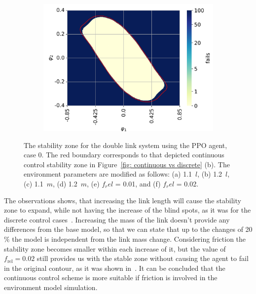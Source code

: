 \begin{figure}[h!]
\begin{subfigure}[t]{0.32\textwidth}
         \includegraphics[width=\textwidth]{Figures/DP_friction_0.02.png}
         \label{fig: DP friction 0.02}
         \caption{}
     \end{subfigure}

     \caption{The stability zone for the double link system using the PPO agent, case 0. The red boundary corresponds to that depicted continuous control stability zone in Figure~\ref{fig: continuous vs discrete} (b). The environment parameters are modified as follows: (a) 1.1~$l$, (b) 1.2~$l$, (c) 1.1~$m$, (d) 1.2~$m$, (e) $f_rel$ = 0.01, and (f) $f_rel$ = 0.02.}
     \label{fig: agent impact on different environments}
 \end{figure}

The observations shows, that increasing the link length will cause the stability zone to expand, while not having the increase of the blind spots, as it was for the discrete control cases~\cite{manzl2023relrl}. Increasing the mass of the link doesn't provide any differences from the base model, so that we can state that up to the changes of 20$\%$ the model is independent from the link mass change.
Considering friction the stability zone becomes smaller within each increase of it, but the value of \( f_{\text{rel}} = 0.02 \) still provides us with the stable zone without causing the agent to fail in the original contour, as it was shown in~\cite{manzl2023relrl}. It can be concluded that the continuous control scheme is more suitable if friction is involved in the environment model simulation.

